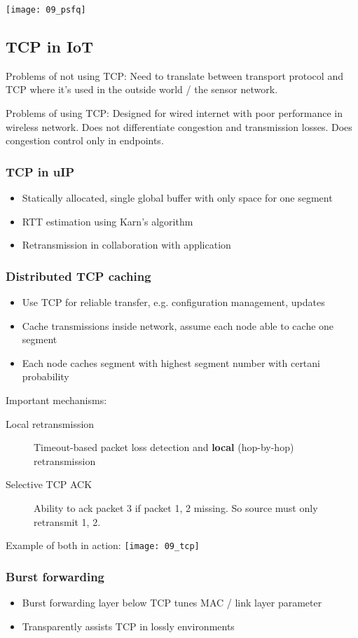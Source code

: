 \texttt{[image: 09\_psfq]}

\subsection{TCP in IoT}

Problems of not using TCP: Need to translate between transport protocol and TCP
where it's used in the outside world / the sensor network.

Problems of using TCP: Designed for wired internet with poor performance in
wireless network. Does not differentiate congestion and transmission losses.
Does congestion control only in endpoints.

\subsubsection{TCP in uIP}

\begin{itemize}
		\item Statically allocated, single global buffer with only space for one segment
		\item RTT estimation using Karn's algorithm
		\item Retransmission in collaboration with application
\end{itemize}

\subsubsection{Distributed TCP caching}

\begin{itemize}
		\item Use TCP for reliable transfer, e.g. configuration management, updates
		\item Cache transmissions inside network, assume each node able to cache one segment
		\item Each node caches segment with highest segment number with certani probability
\end{itemize}

Important mechanisms:

\begin{description}
		\item[Local retransmission] Timeout-based packet loss detection and \textbf{local} (hop-by-hop) retransmission
		\item[Selective TCP ACK] Ability to ack packet 3 if packet 1, 2 missing. So source must only retransmit 1, 2.
\end{description}

Example of both in action:
\texttt{[image: 09\_tcp]}

\subsubsection{Burst forwarding}

\begin{itemize}
		\item Burst forwarding layer below TCP tunes MAC / link layer parameter
		\item Transparently assists TCP in lossly environments
\end{itemize}
		
